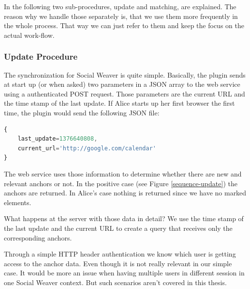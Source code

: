In the following two sub-procedures, update and matching, are explained. The reason why we handle those separately is, that we use them more frequently in the whole process. That way we can just refer to them and keep the focus on the actual work-flow. 

\subsubsection{Update Procedure}
The synchronization for Social Weaver is quite simple. Basically, the plugin sends at start up (or when asked) two parameters in a JSON array to the web service using a authenticated POST request. Those parameters are the current URL and the time stamp of the last update. If Alice starts up her first browser the first time, the plugin would send the following JSON file:


\begin{lstlisting}[language=JavaScript]
{
	last_update=1376640808,
	current_url='http://google.com/calendar'
}
\end{lstlisting}

The web service uses those information to determine whether there are new and relevant anchors or not. In the positive case (see Figure \ref{sequence-update}) the anchors are returned. In Alice's case nothing is returned since we have no marked elements. 

What happens at the server with those data in detail? We use the time stamp of the last update and the current URL to create a query that receives only the corresponding anchors. 

Through a simple HTTP header authentication we know which user is getting access to the anchor data. Even though it is not really relevant in our simple case. It would be more an issue when having multiple users in different session in one Social Weaver context. But such scenarios aren't covered in this thesis.

